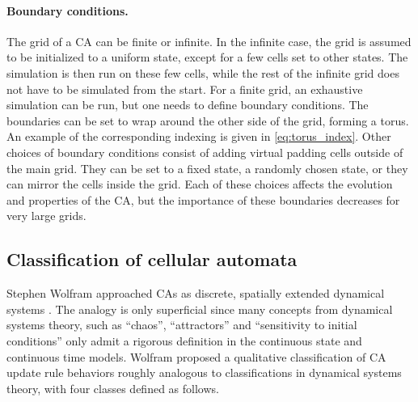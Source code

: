 \paragraph{Boundary conditions.}
The grid of a \ac{CA} can be finite or infinite. In the infinite case, the grid
is assumed to be initialized to a uniform state, except for a few cells set to
other states. The simulation is then run on these few cells, while the rest of
the infinite grid does not have to be simulated from the start. For a finite
grid, an exhaustive simulation can be run, but one needs to define
boundary conditions. The boundaries can be set to wrap around the other side of the
grid, forming a torus. An example of the corresponding indexing is given in
\eqref{eq:torus_index}. Other choices of boundary conditions consist of adding
virtual padding cells outside of the main grid. They can be set to a fixed
state, a randomly chosen state, or they can mirror the cells inside the grid.
Each of these choices affects the evolution and properties of the \ac{CA}, but
the importance of these boundaries decreases for very large grids.

\subsection{Classification of cellular automata\label{sec:class-cell-autom}}

Stephen Wolfram approached \acp{CA} as discrete, spatially extended dynamical
systems \parencite{wolframUniversalityComplexityCellular1984}. The analogy is
only superficial since many concepts from dynamical systems theory, such as
``chaos'', ``attractors'' and ``sensitivity to initial conditions'' only admit a
rigorous definition in the continuous state and continuous time models. Wolfram
proposed a qualitative classification of \ac{CA} update rule behaviors roughly analogous to
classifications in dynamical systems theory, with four classes defined as
follows.

